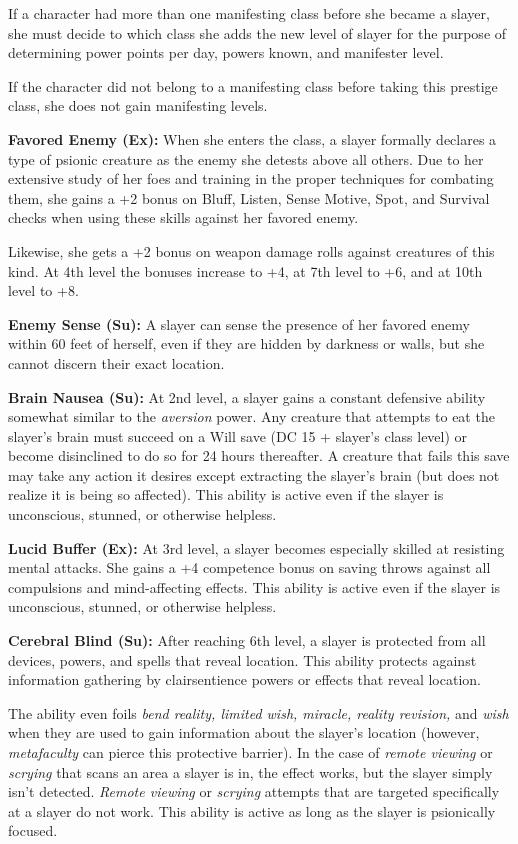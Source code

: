 \documentclass{article}
\begin{document}
If a character had more than one manifesting class before she became a slayer, 
she must decide to which class she adds the new level of slayer for the purpose 
of determining power points per day, powers known, and manifester level.

If the character did not belong to a manifesting class before taking this prestige 
class, she does not gain manifesting levels.

\textbf{Favored Enemy (Ex):} When she enters the class, a slayer formally declares 
a type of psionic creature as the enemy she detests above all others. Due to her 
extensive study of her foes and training in the proper techniques for combating 
them, she gains a +2 bonus on Bluff, Listen, Sense Motive, Spot, and Survival checks 
when using these skills against her favored enemy.

Likewise, she gets a +2 bonus on weapon damage rolls against creatures of this 
kind. At 4th level the bonuses increase to +4, at 7th level to +6, and at 10th 
level to +8.

\textbf{Enemy Sense (Su):} A slayer can sense the presence of her favored enemy 
within 60 feet of herself, even if they are hidden by darkness or walls, but she 
cannot discern their exact location.

\textbf{Brain Nausea (Su):} At 2nd level, a slayer gains a constant defensive ability 
somewhat similar to the \textit{aversion }power. Any creature that attempts to 
eat the slayer's brain must succeed on a Will save (DC 15 + slayer's class level) 
or become disinclined to do so for 24 hours thereafter. A creature that fails this 
save may take any action it desires except extracting the slayer's brain (but does 
not realize it is being so affected). This ability is active even if the slayer 
is unconscious, stunned, or otherwise helpless.

\textbf{Lucid Buffer (Ex):} At 3rd level, a slayer becomes especially skilled at 
resisting mental attacks. She gains a +4 competence bonus on saving throws against 
all compulsions and mind-affecting effects. This ability is active even if the 
slayer is unconscious, stunned, or otherwise helpless.

\textbf{Cerebral Blind (Su): }After reaching 6th level, a slayer is protected from 
all devices, powers, and spells that reveal location. This ability protects against 
information gathering by clairsentience powers or effects that reveal location.

The ability even foils \textit{bend reality, limited wish, miracle, reality revision, 
}and \textit{wish }when they are used to gain information about the slayer's location 
(however, \textit{metafaculty }can pierce this protective barrier). In the case 
of \textit{remote viewing }or \textit{scrying }that scans an area a slayer is in, 
the effect works, but the slayer simply isn't detected. \textit{Remote viewing 
}or \textit{scrying }attempts that are targeted specifically at a slayer do not 
work. This ability is active as long as the slayer is psionically focused.
\end{document}
